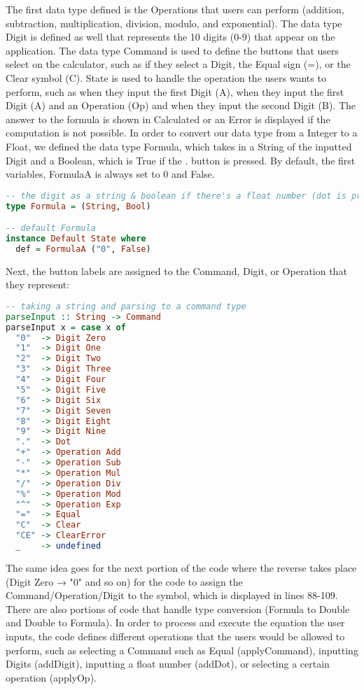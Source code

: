 \documentclass{article}
\begin{document}
\noindent
The first data type defined is the Operations that users can perform (addition, subtraction, multiplication, division, modulo, and exponential). The data type Digit is defined as well that represents the 10 digits (0-9) that appear on the application. The data type Command is used to define the buttons that users select on the calculator, such as if they select a Digit, the Equal sign (=), or the Clear symbol (C). State is used to handle the operation the users wants to perform, such as when they input the first Digit (A), when they input the first Digit (A) and an Operation (Op) and when they input the second Digit (B). The answer to the formula is shown in Calculated or an Error is displayed if the computation is not possible. In order to convert our data type from a Integer to a Float, we defined the data type Formula, which takes in a String of the inputted Digit and a Boolean, which is True if the $.$ button is pressed. By default, the first variables, FormulaA is always set to 0 and False. 

\begin{lstlisting}[language=Haskell]
-- the digit as a string & boolean if there's a float number (dot is pressed)
type Formula = (String, Bool)

-- default Formula 
instance Default State where
  def = FormulaA ("0", False)
\end{lstlisting}

\noindent
Next, the button labels are assigned to the Command, Digit, or Operation that they represent:

\begin{lstlisting}[language=Haskell]
-- taking a string and parsing to a command type
parseInput :: String -> Command
parseInput x = case x of
  "0"  -> Digit Zero
  "1"  -> Digit One
  "2"  -> Digit Two
  "3"  -> Digit Three
  "4"  -> Digit Four
  "5"  -> Digit Five
  "6"  -> Digit Six
  "7"  -> Digit Seven
  "8"  -> Digit Eight
  "9"  -> Digit Nine
  "."  -> Dot
  "+"  -> Operation Add
  "-"  -> Operation Sub
  "*"  -> Operation Mul
  "/"  -> Operation Div
  "%"  -> Operation Mod
  "^"  -> Operation Exp
  "="  -> Equal
  "C"  -> Clear
  "CE" -> ClearError
  _    -> undefined
\end{lstlisting}

\noindent
The same idea goes for the next portion of the code where the reverse takes place (Digit Zero → "0" and so on) for the code to assign the Command/Operation/Digit to the symbol, which is displayed in lines 88-109. There are also portions of code that handle type conversion (Formula to Double and Double to Formula). In order to process and execute the equation the user inputs, the code defines different operations that the users would be allowed to perform, such as selecting a Command such as Equal (applyCommand), inputting Digits (addDigit), inputting a float number (addDot), or selecting a certain operation (applyOp).
\end{document}
